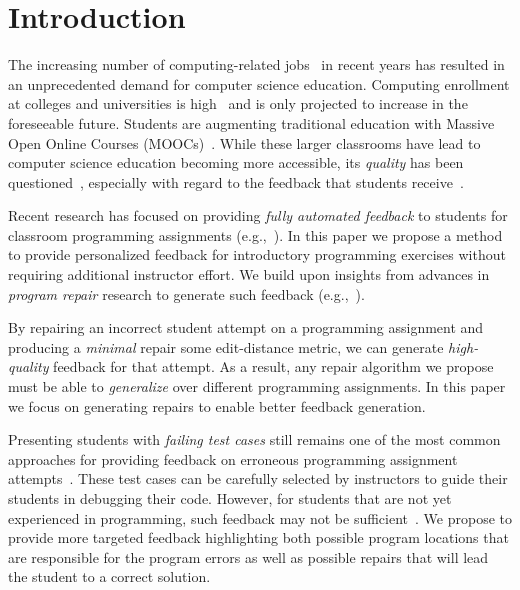\section{Introduction}
\label{sec:intro}

The increasing number of computing-related jobs~\citep[][]{compsci-demand}
in recent years has resulted in an unprecedented
demand for computer science education.  Computing enrollment at colleges
and universities is high~\citep[][]{compsci-classes} and is only projected
to increase in the foreseeable future. Students are augmenting traditional
education with Massive Open Online Courses (MOOCs)~\citep[][]{moocs}.
While these larger classrooms have lead to computer science education
becoming more accessible, its \emph{quality} has been
questioned~\cite{FIXME}, especially with regard to the feedback that
students receive~\cite{FIXME}.

Recent research has focused on providing \emph{fully automated feedback} to
students for classroom programming assignments (e.g.,~\cite{FIXME,FIXME}). In
this paper we propose a method to provide personalized
feedback for introductory programming exercises without requiring
additional instructor effort. We build upon insights from advances in
\emph{program repair} research to generate such feedback
(e.g.,~\cite{FIXME,FIXME}).

By repairing an incorrect student attempt on a programming assignment and
producing a \emph{minimal} repair \wrt some edit-distance metric,
we can generate \emph{high-quality}
feedback for that attempt. As a result, any repair algorithm we propose must be
able to \emph{generalize} over different programming assignments.
In this paper we focus on generating
repairs to enable better feedback generation.

Presenting students with \emph{failing test cases} still remains one of the most
common approaches for providing feedback on erroneous programming assignment
attempts~\cite{FIXME,FIXME}. These test cases can be carefully selected by instructors to guide
their students in debugging their code. However, for students that are not yet
experienced in programming, such feedback may not be
sufficient~\cite{FIXME}. We propose to provide
more targeted feedback highlighting both possible program
locations that are responsible for the program errors as well as possible
repairs that will lead the student to a correct solution.

